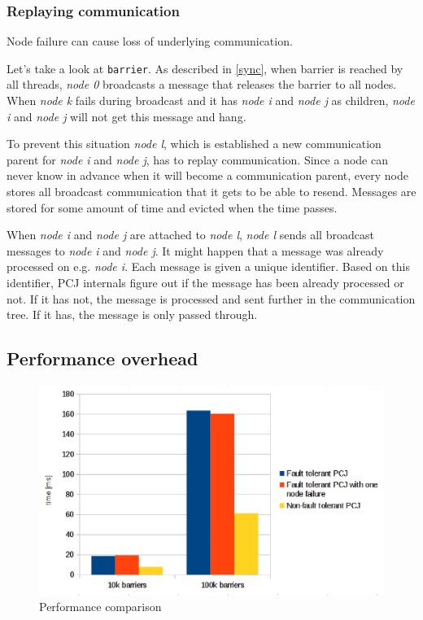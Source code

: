\documentclass{llncs}
\newcommand{\inlinecode}{\texttt}
\begin{document}
\subsubsection{Replaying communication}
Node failure can cause loss of underlying communication.

Let's take a look at \inlinecode{barrier}.
As described in \ref{sync}, when barrier is reached by all threads, \emph{node 0} broadcasts a message that releases the barrier to all nodes.
When \emph{node k} fails during broadcast and it has \emph{node i} and \emph{node j} as children, \emph{node i} and \emph{node j} will not get this message and hang.

To prevent this situation \emph{node l}, which is established a new communication parent for \emph{node i} and \emph{node j}, has to replay communication.
Since a node can never know in advance when it will become a communication parent, every node stores all broadcast communication that it gets to be able to resend.
Messages are stored for some amount of time and evicted when the time passes.

When \emph{node i} and \emph{node j} are attached to \emph{node l}, \emph{node l} sends all broadcast messages to \emph{node i} and \emph{node j}.
It might happen that a message was already processed on e.g. \emph{node i}.
Each message is given a unique identifier. Based on this identifier, PCJ internals figure out if the message has been already processed or not.
If it has not, the message is processed and sent further in the communication tree. If it has, the message is only passed through.

\subsection{Performance overhead}

\begin{figure}
  \centering
      \includegraphics[width=1\textwidth]{barrier-test-chart.eps}
  \caption{Performance comparison}
  \label{performance}
\end{figure}
\end{document}
